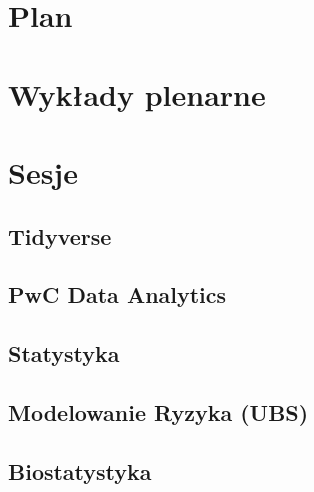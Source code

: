\documentclass[11pt,twoside,b5paper]{book}
\newcommand{\mychapter}[1]{\chapter{#1} \newpage}
\begin{document}
\chapter{Plan}

\mychapter{Wykłady plenarne}{}

\newpage

\newpage

\newpage

\newpage

\newpage

\newpage

\newpage

\newpage

\newpage


\chapter{Sesje}{\LARGE}
\section{Tidyverse}{}






\section{PwC Data Analytics}


\section{Statystyka}






\section{Modelowanie Ryzyka (UBS)}




\section{Biostatystyka}





\end{document}
